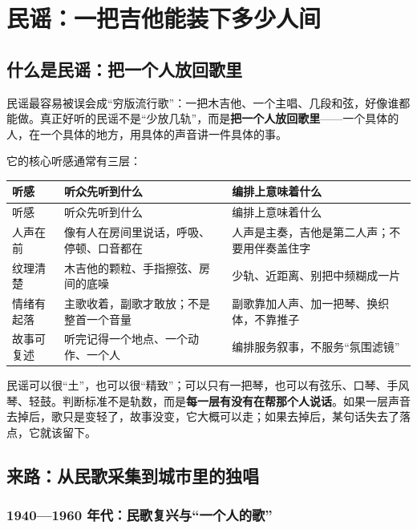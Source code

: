 \chapter{民谣：一把吉他能装下多少人间}
\label{ch:genre-folk-deep}


\section{什么是民谣：把一个人放回歌里}
\label{sec:folk-what}

民谣最容易被误会成“穷版流行歌”：一把木吉他、一个主唱、几段和弦，好像谁都能做。真正好听的民谣不是“少放几轨”，而是\textbf{把一个人放回歌里}——一个具体的人，在一个具体的地方，用具体的声音讲一件具体的事。

它的核心听感通常有三层：

\begin{longtable}{p{}p{}p{}}
\toprule
听感 & 听众先听到什么 & 编排上意味着什么 \\
\midrule
\endfirsthead
\toprule
听感 & 听众先听到什么 & 编排上意味着什么 \\
\midrule
\endhead
人声在前 & 像有人在房间里说话，呼吸、停顿、口音都在 & 人声是主奏，吉他是第二人声；不要用伴奏盖住字 \\
纹理清楚 & 木吉他的颗粒、手指擦弦、房间的底噪 & 少轨、近距离、别把中频糊成一片 \\
情绪有起落 & 主歌收着，副歌才敢放；不是整首一个音量 & 副歌靠加人声、加一把琴、换织体，不靠推子 \\
故事可复述 & 听完记得一个地点、一个动作、一个人 & 编排服务叙事，不服务“氛围滤镜” \\
\bottomrule
\end{longtable}

民谣可以很“土”，也可以很“精致”；可以只有一把琴，也可以有弦乐、口琴、手风琴、轻鼓。判断标准不是轨数，而是\textbf{每一层有没有在帮那个人说话}。如果一层声音去掉后，歌只是变轻了，故事没变，它大概可以走；如果去掉后，某句话失去了落点，它就该留下。

\section{来路：从民歌采集到城市里的独唱}
\label{sec:folk-history}

\subsection{1940—1960 年代：民歌复兴与“一个人的歌”}
\label{sec:folk-history-1940s}

